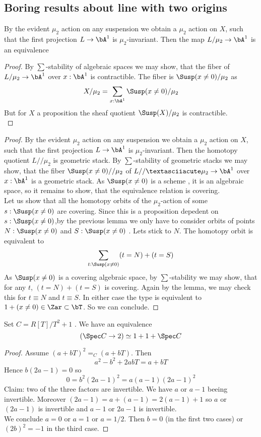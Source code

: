 \subsection{Boring results about line with two origins}
By the evident $\mu_2$ action on any suspension we obtain a $\mu_2$ action on $X$, such that the first projection $L \to \bA^1$ is $\mu_2$-invariant. Then the map $L / \mu_2 \to \bA^1$ is an equivalence
\begin{proof}
	By $\sum$-stability of algebraic spaces we may show, that the fiber of $L / \mu_2 \to \bA^1$ over $x : \bA^1$ is contractible. The fiber is $\Susp(x \neq 0) / \mu_2$ as 
	\[
	X / \mu_2 = \sum_{x : \bA^1} \Susp(x \neq 0)/\mu_2
	\]
	But for $X$ a proposition the sheaf quotient $\Susp(X) / \mu_2$ is contractible. \\
\end{proof}
\begin{proof}
	By the evident $\mu_2$ action on any suspension we obtain a $\mu_2$ action on $X$, such that the first projection $L \to \bA^1$ is $\mu_2$-invariant. Then the homotopy quotient $L // \mu_2$ is geometric stack. %
	By $\sum$-stability of geometric stacks we may show, that the fiber $\Susp(x \neq 0) // \mu_2$ of $L //´ \mu_2 \to \bA^1$ over $x : \bA^1$ is a geometric stack. As $\Susp(x \neq 0)$ is a scheme \todocite, it is an algebraic space, so it remains to show, that the equivalence relation is covering. \\
	Let us show that all the homotopy orbits of the $\mu_2$-action of some $s : \Susp(x \neq 0)$ are covering. Since this is a proposition depedent on $s : \Susp(x \neq 0)$,by the previous lemma we only have to consider orbits of points $N : \Susp(x\neq0)$ and $S : \Susp(x \neq 0)$ . Lets stick to $N$. The homotopy orbit is equivalent to 
	\[
	\sum_{t : \Susp(x \neq 0)}  (t = N) + (t = S) %
	\]
	As $\Susp(x \neq 0)$ is a covering algebraic space, by $\sum$-stability we may show, that for any $t$, $(t = N) + (t = S)$ is covering. Again by the lemma, we may check this for $t \equiv N$ and $t \equiv S$. In either case the type is equivalent to $1 + (x \neq 0) \in \Zar \subset \bT$. So we can conclude.
\end{proof}


\begin{lemma}
	Set $C = R[T] / T^2 + 1$ . We have an equivalence 
	\[
	(\Spec C \to 2) \simeq 1 + 1 + \Spec C
	\]
\end{lemma}
\begin{proof}
	Assume $(a+bT)^2 =_C (a+bT)$. Then
	\[
	a^2 - b^2 + 2abT = a + bT
	\]
	Hence $b(2a - 1) = 0$ so
	\[
	0 = b^2 (2a-1)^2 = a (a - 1) (2a-1)^2 
	\]
	Claim: two of the three factors are invertible.
	We have $a$ or $a-1$ beeing invertible. Moreover $(2a - 1) = a + (a-1) = 2 (a-1) + 1$ so $a$ or $(2a-1)$ is invertible and $a-1$ or $2a-1$ is invertible. \\
	We conclude $a = 0$ or $a = 1$ or $a = 1/2$. Then $b = 0$ (in the first two cases) or $(2b)^2 = -1$ in the third case.
\end{proof}

